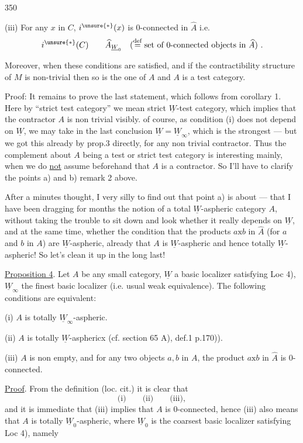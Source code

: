 350

(iii) For any $x$ in $C$, $i^{\unsure{*}}(x)$ is 0-connected in $\widehat A$ i.e.
\[
i^{\unsure{*}}(C)\qquad\widehat A_{\underline W_0}
\quad(\overset{\mathrm{def}}=\text{set of 0-connected objects in $\widehat A$})\ .
\]

Moreover, when these conditions are satisfied, 
and if the contractibility structure of $M$ is non-trivial
 
then so is the one of $A$ and $A$ is a  test category.

Proof:  It remains to prove the last statement, which follows
from corollary 1.
Here by ``strict test category'' we mean strict $\underline W$-test category,
which implies that the contractor $A$ is non trivial visibly.
 of course, as condition (i) does not depend on $\underline W$,
we may take in the last conclusion $\underline W=\underline W_\infty$,
which is the strongest --- but we got this already by prop.3 directly,
for any non trivial contractor. Thus the complement about $A$ being a test or
strict test category is interesting mainly, when we do \uline{not} assume
beforehand that $A$ is a contractor. So I'll have to clarify the points a) and b)
 remark 2 above.

After a minutes thought, I  very silly to find out that point a)
is about  --- that I have been dragging for months the notion
of a total $\underline W$-aspheric category $A$, without
 taking the trouble to sit down and look whether it really depends
on $\underline W$, and at the same time, whether the condition that the products
$a\mathbin{\mathrm{x}}b$ in $\widehat A$ (for $a$ and $b$ in $A$) are
$\underline W$-aspheric, already  that $A$ is
$\underline W$-aspheric and hence totally $\underline W$-aspheric!
So let's clean it up in the long last!

\uline{Proposition 4}. Let $A$ be any small category, $\underline W$ a basic
localizer satisfying Loc 4), $\underline W_\infty$ 
the finest basic localizer (i.e. usual weak equivalence).
The following conditions are equivalent:

(i) $A$ is totally $\underline W_\infty$-aspheric.

(ii) $A$ is totally $\underline W$-asphericx (cf. section 65 A), def.1 p.170)).

(iii) $A$ is non empty, and for any two objects $a,b$ in $A$,
 the product $a\mathbin{\mathrm{x}}b$
in $\widehat A$ is 0-connected.

\uline{Proof}. From the definition (loc. cit.) it is clear that
\[
\text{(i)}\qquad\text{(ii)}\qquad\text{(iii)},
\]
and it is immediate that (iii) implies that $A$ is 0-connected, hence
(iii) also means that $A$ is totally $\underline W_0$-aspheric,
where $\underline W_0$ is the coarsest basic localizer satisfying Loc 4), namely

